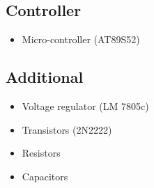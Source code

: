\documentclass[11pt]{article}
\begin{document}
\subsection*{Controller}
\begin{itemize}
    \item Micro-controller (AT89S52)
\end{itemize}

\subsection*{Additional}
\begin{itemize}
    \item Voltage regulator (LM 7805c)
\item Transistors (2N2222) 
\item Resistors
\item Capacitors

\end{itemize}
	
\end{document}
